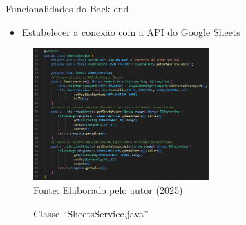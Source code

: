 \begin{frame}{Funcionalidades do Back-end}
    \begin{itemize}
		\item Estabelecer a conexão com a API do Google Sheets
	\end{itemize}
    \begin{figure}
        \centering
        \vspace{-0.5cm}
        \caption{Classe ``SheetsService.java''}
        \vspace{-0.2cm}
        \includegraphics[width=0.6\textwidth]{figuras/back-2.png}
        \\ %
        \small Fonte: Elaborado pelo autor (2025)
    \end{figure}
\end{frame}

